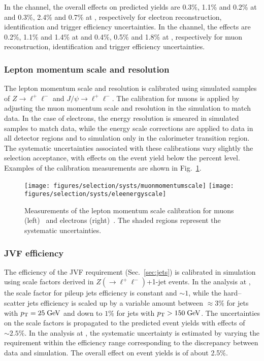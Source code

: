 In the \ejets{} channel, the overall effects on predicted yields are 0.3\%, 1.1\% 
and 0.2\% at \seventev{} and 0.3\%, 2.4\% and 0.7\% at \eighttev{},
respectively for electron reconstruction, identification and trigger
efficiency uncertainties.
In the \mujets{} channel, the effects are 0.2\%, 1.1\% and 1.4\% at
\seventev{} and 0.4\%, 0.5\% and 1.8\% at \eighttev{},
respectively for muon reconstruction, identification and trigger
efficiency uncertainties.

\subsubsection{Lepton momentum scale and resolution}
\label{sec:lepscale}

The lepton momentum scale and resolution is calibrated using
simulated samples of $Z\to \ell^+\ell^-$ and $J/\psi \to
\ell^+\ell^-$.
The calibration for muons is applied by adjusting the muon momentum
scale and resolution in the simulation to match data. In the case of
electrons, the energy resolution is smeared in simulated samples to
match data, while the energy scale corrections are applied to data in
all detector regions and to simulation only in the calorimeter
transition region. 
The systematic uncertainties associated with these calibrations vary
slightly the selection acceptance, with effects on the event yield
below the percent level. Examples of the calibration measurements are
shown in Fig.~\ref{fig:lepscalesyst}.

\begin{figure}\centering
  \texttt{[image: figures/selection/systs/muonmomentumscale]}
  \texttt{[image: figures/selection/systs/eleenergyscale]}
  \caption{
    Measurements of the lepton momentum scale calibration for muons
    (left)~\cite{Sforza:1529999} and electrons
    (right)~\cite{Aad:2014nim}. The shaded regions represent the
    systematic uncertainties. 
  }
  \label{fig:lepscalesyst}
\end{figure}

\subsubsection{JVF efficiency}
\label{sec:syst_jvf}

The efficiency of the JVF requirement (Sec.~\ref{sec:jets}) is
calibrated in simulation using scale factors derived in $Z(\to
\ell^+\ell^-)$+1-jet events. In the analysis at \seventev{}, the scale
factor for pileup jets efficiency is constant and $\sim1$, while the
hard--scatter jets efficiency is scaled up by a variable amount
between $\approx3\%$ for jets with $p_{\mathrm{T}}{}=25\; \mathrm{GeV}{}$ and down to $1\%$
for jets with $p_{\mathrm{T}}{}>150\; \mathrm{GeV}{}$. The uncertainties on the scale
factors is propagated to the predicted event yields with effects of
$\sim2.5\%$. In the analysis at \eighttev{}, the systematic
uncertainty is estimated by varying the requirement within the
efficiency range corresponding to the discrepancy between data and
simulation. The overall effect on event yields is of about 2.5\%.


